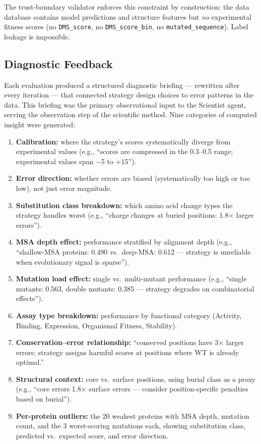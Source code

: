 \documentclass[11pt,a4paper]{article}
\begin{document}
The trust-boundary validator enforces this constraint by construction: the data database contains model predictions and structure features but \emph{no} experimental fitness scores (no \texttt{DMS\_score}, no \texttt{DMS\_score\_bin}, no \texttt{mutated\_sequence}). Label leakage is impossible.

\subsection{Diagnostic Feedback}

Each evaluation produced a structured diagnostic briefing --- rewritten after every iteration --- that connected strategy design choices to error patterns in the data. This briefing was the primary observational input to the Scientist agent, serving the observation step of the scientific method. Nine categories of computed insight were generated:

\begin{enumerate}
    \item \textbf{Calibration:} where the strategy's scores systematically diverge from experimental values (e.g., ``scores are compressed in the 0.3--0.5 range; experimental values span $-$5 to +15'').
    \item \textbf{Error direction:} whether errors are biased (systematically too high or too low), not just error magnitude.
    \item \textbf{Substitution class breakdown:} which amino acid change types the strategy handles worst (e.g., ``charge changes at buried positions: 1.8$\times$ larger errors'').
    \item \textbf{MSA depth effect:} performance stratified by alignment depth (e.g., ``shallow-MSA proteins: 0.490 vs.\ deep-MSA: 0.612 --- strategy is unreliable when evolutionary signal is sparse'').
    \item \textbf{Mutation load effect:} single vs.\ multi-mutant performance (e.g., ``single mutants: 0.563, double mutants: 0.385 --- strategy degrades on combinatorial effects'').
    \item \textbf{Assay type breakdown:} performance by functional category (Activity, Binding, Expression, Organismal Fitness, Stability).
    \item \textbf{Conservation--error relationship:} ``conserved positions have 3$\times$ larger errors; strategy assigns harmful scores at positions where WT is already optimal.''
    \item \textbf{Structural context:} core vs.\ surface positions, using burial class as a proxy (e.g., ``core errors 1.8$\times$ surface errors --- consider position-specific penalties based on burial'').
    \item \textbf{Per-protein outliers:} the 20 weakest proteins with MSA depth, mutation count, and the 3 worst-scoring mutations each, showing substitution class, predicted vs.\ expected score, and error direction.
\end{enumerate}
\end{document}
